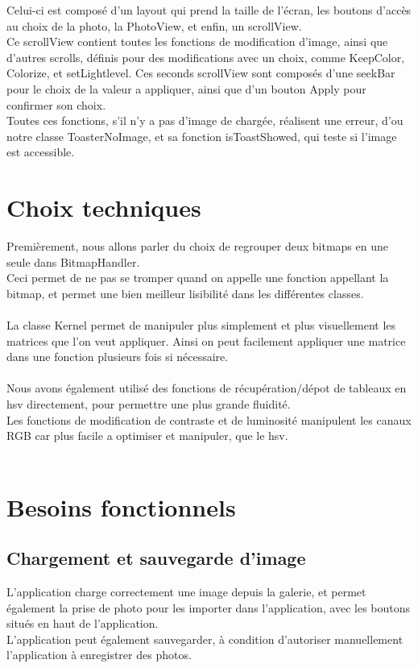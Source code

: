 \documentclass[12pt]{article}
\begin{document}
    Celui-ci est composé d'un layout qui prend la taille de l'écran, les boutons d'accès au choix de la photo, la PhotoView, et enfin, un scrollView.\\
    Ce scrollView contient toutes les fonctions de modification d'image, ainsi que d'autres scrolls, définis pour des modifications avec un choix, comme KeepColor, Colorize, et setLightlevel.
    Ces seconds scrollView sont composés d'une seekBar pour le choix de la valeur a appliquer, ainsi que d'un bouton Apply pour confirmer son choix.\\
    Toutes ces fonctions, s'il n'y a pas d'image de chargée, réalisent une erreur, d'ou notre classe ToasterNoImage, et sa fonction isToastShowed, qui teste si l'image est accessible.\\

    \bigskip

\section{Choix techniques}
    Premièrement, nous allons parler du choix de regrouper deux bitmaps en une seule dans BitmapHandler. \\
    Ceci permet de ne pas se tromper quand on appelle une fonction appellant la bitmap, et permet une bien meilleur lisibilité dans les différentes classes.\\
    \\
    La classe Kernel permet de manipuler plus simplement et plus visuellement les matrices que l'on veut appliquer. Ainsi on peut facilement appliquer une matrice dans une fonction plusieurs fois si nécessaire.
    \\
    \\
    Nous avons également utilisé des fonctions de récupération/dépot de tableaux en hsv directement, pour permettre une plus grande fluidité.
    \\
    Les fonctions de modification de contraste et de luminosité manipulent les canaux RGB car plus facile a optimiser et manipuler, que le hsv.\\
    \\



\section{Besoins fonctionnels}



    \subsection{Chargement et sauvegarde d'image}
    L'application charge correctement une image depuis la galerie, et permet également la prise de photo pour les importer dans l'application,
     avec les boutons situés en haut de l'application.\\
    L'application peut également sauvegarder, à condition d'autoriser manuellement l'application à enregistrer des photos.\\
    
\end{document}
